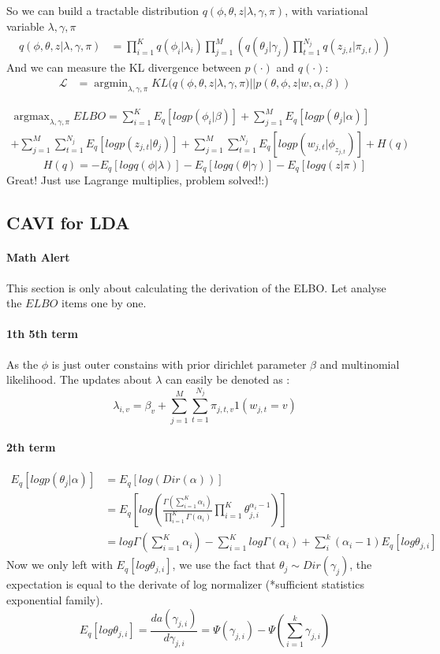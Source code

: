 \documentclass{article}
\begin{document}
So we can build a tractable distribution $q(\phi,\theta,z|\lambda ,\gamma, \pi)$, with variational variable $\lambda ,\gamma, \pi$
\begin{align*}
q(\phi,\theta,z|\lambda ,\gamma, \pi) &= \prod_{i=1}^{K}q(\phi_{i}|\lambda_{i}) \prod_{j=1}^{M}\left(q(\theta_{j}|\gamma_{j})\prod_{t=1}^{N_{j}}q(z_{j,t}|\pi_{j,t})\right)
\end{align*}
And we can measure the KL divergence between $p(\cdot)$ and $q(\cdot)$:
\begin{align*}
\mathcal{L} &= \mathop{\arg\min}_{\lambda ,\gamma, \pi} KL(q(\phi,\theta,z|\lambda ,\gamma, \pi)||p(\theta,\phi,z|w,\alpha,\beta))
\end{align*}

\begin{align*}
\mathop{\arg\max}_{\lambda ,\gamma, \pi} ELBO =\sum_{i=1}^{K}E_{q}[log p(\phi_{i}|\beta)]+\sum_{j=1}^{M}E_{q}[log p(\theta_{j}|\alpha)] \\
+\sum_{j=1}^{M}\sum_{t=1}^{N_{j}}E_{q}[logp(z_{j,t}|\theta_{j})] 
+\sum_{j=1}^{M}\sum_{t=1}^{N_{j}}E_{q}[logp(w_{j,t}|\phi_{z_{j,t}})]
+H(q)
\end{align*}
$$H(q)=-E_{q}[logq(\phi|\lambda)]-E_{q}[logq(\theta|\gamma)]-E_{q}[logq(z|\pi)]$$
Great! Just use Lagrange multiplies, problem solved!:)
\subsection{CAVI for LDA}
\paragraph{Math Alert} This section is only about calculating the derivation of the ELBO. 
Let analyse the $ELBO$ items one by one.
\paragraph{1th 5th term}
As the $\phi$ is just  outer constains with prior dirichlet parameter $\beta$ and multinomial likelihood. The updates about $\lambda$ can easily be denoted as : 
$$\lambda_{i,v}=\beta_{v}+\sum_{j=1}^{M}\sum_{t=1}^{N_{j}}\pi_{j,t,v}1(w_{j,t}=v)$$

\paragraph{2th term}
\begin{align*}
E_{q}[log p(\theta_{j}|\alpha)] &= E_{q}[log(Dir(\alpha))] \\
&=E_{q}\left[ log\left( \frac{\Gamma(\sum_{i=1}^{K}\alpha_{i})}{\prod_{i=1}^{K} \Gamma(\alpha_{i})} \prod_{i=1}^{K}\theta_{j,i}^{\alpha_{i}-1}\right)\right] \\
&= log \Gamma(\sum_{i=1}^{K}\alpha_{i})-\sum_{i=1}^{K}log \Gamma(\alpha_{i}) +\sum_{i}^{k}(\alpha_{i}-1)E_{q}[log\theta_{j,i}]
\end{align*}
Now we only left with $E_{q}[log\theta_{j,i}]$, we use the fact that $\theta_{j} \sim Dir(\gamma_{j})$, the expectation is equal to the derivate of log normalizer (*sufficient statistics exponential family).
$$E_{q}[log\theta_{j,i}]=\frac{da(\gamma_{j,i})}{d\gamma_{j,i}}=\Psi(\gamma_{j,i})-\Psi\left( \sum_{i=1}^{k} \gamma_{j,i} \right)$$
\end{document}
